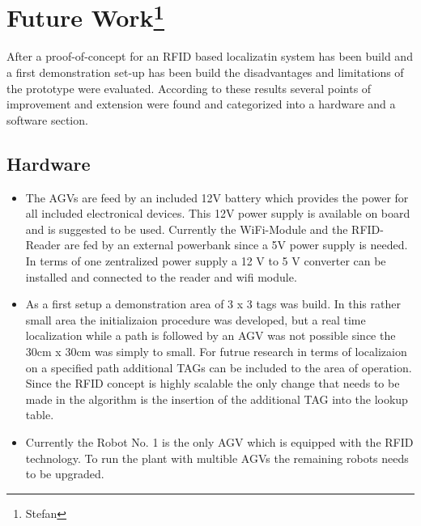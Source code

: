 
\section[Future Work]{Future Work\footnote{Stefan}}
After a proof-of-concept for an RFID based localizatin system has been build and a first demonstration set-up has been build the disadvantages and limitations of the prototype were evaluated. According to these results several points of improvement and extension were found and categorized into a hardware and a software section. 
\subsection{Hardware}
\begin{itemize}
\item The AGVs are feed by an included 12V battery which provides the power for all included electronical devices. This 12V power supply is available on board and is suggested to be used. Currently the WiFi-Module and the RFID-Reader are fed by an external powerbank since a 5V power supply is needed. In terms of one zentralized power supply a 12 V to 5 V converter can be installed and connected to the reader and wifi module.
\item As a first setup a demonstration area of 3 x 3 tags was build. In this rather small area the initializaion procedure was developed, but a real time localization while a path is followed by an AGV was not possible since the 30cm x 30cm was simply to small. For futrue research in terms of localizaion on a specified path additional TAGs can be included to the area of operation. Since the RFID concept is highly scalable the only change that needs to be made in the algorithm is the insertion of the additional TAG into the lookup table.
\item Currently the Robot No. 1 is the only AGV which is equipped with the RFID technology. To run the plant with multible AGVs the remaining robots needs to be upgraded.\\
\end{itemize}
